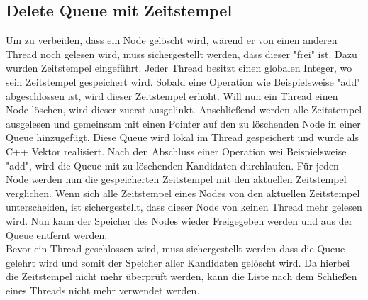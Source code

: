 \subsection{Delete Queue mit Zeitstempel}
Um zu verbeiden, dass ein Node gelöscht wird, wärend er von einen anderen Thread noch gelesen wird, muss sichergestellt werden, dass dieser "frei" ist. 
Dazu wurden Zeitstempel eingeführt. Jeder Thread besitzt einen globalen Integer, wo sein Zeitstempel gespeichert wird. Sobald eine Operation
wie Beispielsweise "add" abgeschlossen ist, wird dieser Zeitstempel erhöht.  Will nun ein Thread einen Node löschen, wird dieser zuerst ausgelinkt. 
Anschließend werden alle Zeitstempel ausgelesen und gemeinsam mit einen Pointer auf den zu löschenden Node in einer Queue hinzugefügt. Diese 
Queue wird lokal im Thread gespeichert und wurde als C++ Vektor realisiert. Nach den Abschluss einer Operation wei Beispielsweise "add", wird 
die Queue mit zu löschenden Kandidaten durchlaufen. Für jeden Node werden nun die gespeicherten Zeitstempel mit den aktuellen Zeitstempel verglichen. 
Wenn sich alle Zeitstempel eines Nodes von den aktuellen Zeitstempel unterscheiden, ist sichergestellt, dass dieser Node von keinen Thread mehr gelesen wird. 
Nun kann der Speicher des Nodes wieder Freigegeben werden und aus der Queue entfernt werden. 
\\Bevor ein Thread geschlossen wird, muss sichergestellt werden
dass die Queue gelehrt wird und somit der Speicher aller Kandidaten gelöscht wird. Da hierbei die Zeitstempel nicht mehr überprüft werden,
kann die Liste nach dem Schließen eines Threads nicht mehr verwendet werden. 
